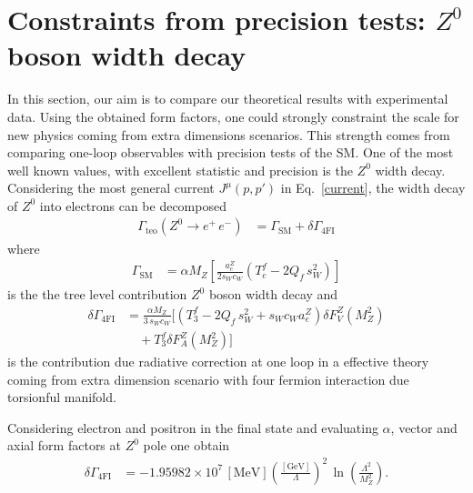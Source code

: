 \section{\label{sec:constraints}Constraints from precision tests: $Z^0$ boson width decay}

In this section, our aim is to compare our theoretical results with experimental data. Using the obtained form factors, one could strongly constraint the scale for new physics coming from extra dimensions scenarios. This strength comes from comparing one-loop observables with precision tests of the SM. One of the most well known values, with excellent statistic and precision is the $Z^0$ width decay. Considering the most general current $J^\mu(p,p')$ in Eq.~\eqref{current}, the width decay of $Z^0$ into electrons can be decomposed
\begin{align}
\Gamma_{\text{teo}}\left(Z^0\rightarrow e^+\,e^-\right) &= \Gamma_{\text{SM}} + \delta\Gamma_{\text{4FI}}
\end{align}
where
\begin{align}
 \Gamma_{\text{SM}} &= \alpha M_Z\left[\frac{a_e^Z}{2s_Wc_W}(T_e^f - 2Q_f\,s_W^2)\right] 
\end{align}
is the the tree level contribution $Z^0$ boson width decay and
\begin{align}
\nonumber
  \delta\Gamma_{\text{4FI}} &= \frac{\alpha M_Z}{3\,s_Wc_W}\Bigg[(T_3^f - 2Q_f\,s_W^2+s_Wc_Wa_e^Z)\delta F_V^Z(M_Z^2)\\
  &\quad + T_3^f\delta F_A^Z(M_Z^2)\Bigg]
\end{align}
is the contribution due radiative correction at one loop in a effective theory coming from extra dimension scenario with four fermion interaction due torsionful manifold.

Considering electron and positron in the final state and evaluating $\alpha$, vector and axial form factors at $Z^0$ pole one obtain 
\begin{align}
\label{deltagammateo}
 \delta\Gamma_{\text{4FI}} &= -1.95982\times10^7\,[\text{MeV}]\left(\frac{[\text{GeV}]}{\Lambda}\right)^2\,\ln\left(\frac{\Lambda^2}{M_Z^2}\right).
\end{align}

